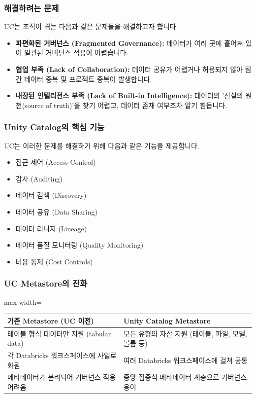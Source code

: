 \documentclass[11pt,a4paper]{article}
\begin{document}
\subsubsection*{해결하려는 문제}
UC는 조직이 겪는 다음과 같은 문제들을 해결하고자 합니다.
\begin{itemize}
    \item \textbf{파편화된 거버넌스 (Fragmented Governance):} 데이터가 여러 곳에 흩어져 있어 일관된 거버넌스 적용이 어렵습니다.
    \item \textbf{협업 부족 (Lack of Collaboration):} 데이터 공유가 어렵거나 허용되지 않아 팀 간 데이터 중복 및 프로젝트 중복이 발생합니다.
    \item \textbf{내장된 인텔리전스 부족 (Lack of Built-in Intelligence):} 데이터의 '진실의 원천(source of truth)'을 찾기 어렵고, 데이터 존재 여부조차 알기 힘듭니다.
\end{itemize}

\subsubsection*{Unity Catalog의 핵심 기능}
UC는 이러한 문제를 해결하기 위해 다음과 같은 기능을 제공합니다.
\begin{itemize}
    \item 접근 제어 (Access Control)
    \item 감사 (Auditing)
    \item 데이터 검색 (Discovery)
    \item 데이터 공유 (Data Sharing)
    \item 데이터 리니지 (Lineage)
    \item 데이터 품질 모니터링 (Quality Monitoring)
    \item 비용 통제 (Cost Controls)
\end{itemize}

\subsubsection*{UC Metastore의 진화}
\begin{adjustbox}{max width=\textwidth}
\begin{tabular}{p{}p{}}
\toprule
\textbf{기존 Metastore (UC 이전)} & \textbf{Unity Catalog Metastore} \\
\midrule
테이블 형식 데이터만 지원 (tabular data) & 모든 유형의 자산 지원 (테이블, 파일, 모델, 볼륨 등) \\
각 Databricks 워크스페이스에 사일로화됨 & 여러 Databricks 워크스페이스에 걸쳐 공통 \\
메타데이터가 분리되어 거버넌스 적용 어려움 & 중앙 집중식 메타데이터 계층으로 거버넌스 용이 \\
\bottomrule
\end{tabular}
\end{adjustbox}
\label{tab:uc_metastore_comparison}
\end{document}
